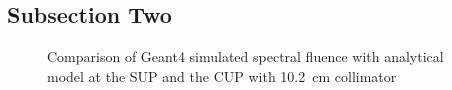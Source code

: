 \documentclass[12pt,journal]{IEEEtran}
\let\MYoriglatexcaption\caption
\renewcommand{\caption}[2][\relax]{\MYoriglatexcaption[#2]{#2}}
\begin{document}
\subsection{Subsection Two}
\begin{figure}[!t]
	\centering
	\hfil
	\caption{Comparison of Geant4 simulated spectral fluence with analytical model at the SUP and the CUP with \SI{10.2}{\cm} collimator~\cite{Prokofiev2009,Prokofiev14}}
	\label{fig:NYieldComparedSUPCUP10}
\end{figure}
\end{document}
